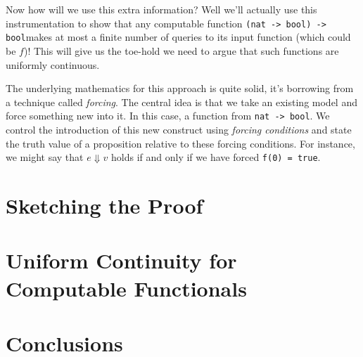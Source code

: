 \documentclass[12pt]{amsart}
\begin{document}
Now how will we use this extra information? Well we'll actually use
this instrumentation to show that any computable function {\tt (nat ->
  bool) -> bool}makes at most a finite number of queries to its input
function (which could be $f$)! This will give us the toe-hold we need
to argue that such functions are uniformly continuous.

The underlying mathematics for this approach is quite solid, it's
borrowing from a technique called \emph{forcing}. The central idea is
that we take an existing model and force something new into it. In
this case, a function from {\tt nat -> bool}. We control the
introduction of this new construct using \emph{forcing conditions} and
state the truth value of a proposition relative to these forcing
conditions. For instance, we might say that $e \Downarrow v$ holds if
and only if we have forced {\tt f(0) = true}.

\section{Sketching the Proof}
\section{Uniform Continuity for Computable Functionals}
\section{Conclusions}
\end{document}
